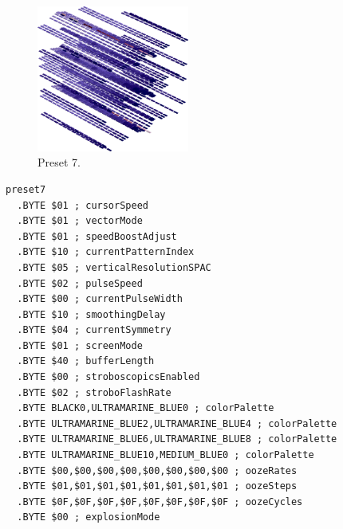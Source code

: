\begin{minipage}[b]{0.48\linewidth}
\begin{figure}[H]                                                          
  \centering                                                             
  \begin{adjustbox}{width=5cm,center}                                   
  \includegraphics[width=5cm]{src/colorspace_presets/preset7-45.png}%
  \end{adjustbox}                                                        
\caption*{Preset 7.}                                           
\end{figure}                                                               
\end{minipage}
\hspace{0.1cm}
\begin{minipage}[b]{0.48\linewidth}                                       
\begin{lstlisting}[basicstyle=\ttfamily\tiny]
preset7
  .BYTE $01 ; cursorSpeed
  .BYTE $01 ; vectorMode
  .BYTE $01 ; speedBoostAdjust
  .BYTE $10 ; currentPatternIndex
  .BYTE $05 ; verticalResolutionSPAC
  .BYTE $02 ; pulseSpeed
  .BYTE $00 ; currentPulseWidth
  .BYTE $10 ; smoothingDelay
  .BYTE $04 ; currentSymmetry
  .BYTE $01 ; screenMode
  .BYTE $40 ; bufferLength
  .BYTE $00 ; stroboscopicsEnabled
  .BYTE $02 ; stroboFlashRate
  .BYTE BLACK0,ULTRAMARINE_BLUE0 ; colorPalette
  .BYTE ULTRAMARINE_BLUE2,ULTRAMARINE_BLUE4 ; colorPalette
  .BYTE ULTRAMARINE_BLUE6,ULTRAMARINE_BLUE8 ; colorPalette
  .BYTE ULTRAMARINE_BLUE10,MEDIUM_BLUE0 ; colorPalette
  .BYTE $00,$00,$00,$00,$00,$00,$00,$00 ; oozeRates
  .BYTE $01,$01,$01,$01,$01,$01,$01,$01 ; oozeSteps
  .BYTE $0F,$0F,$0F,$0F,$0F,$0F,$0F,$0F ; oozeCycles
  .BYTE $00 ; explosionMode
\end{lstlisting}
\end{minipage}

